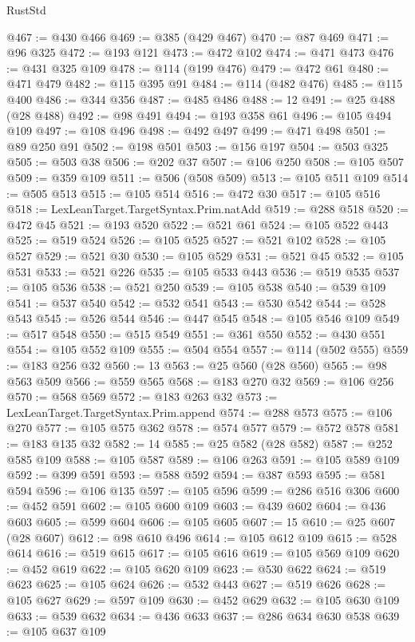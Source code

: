 \begin{lexlean}{RustStd}
\begin{coremodule}
{\begin{coremodule}
{{{{{{{{{{{{{{{{{{{{{{{{{{{{{{{{{{@467 := @430 @466
@469 := @385 (@429 @467)
@470 := @87 @469
@471 := @96 @325
@472 := @193 @121
@473 := @472 @102
@474 := @471 @473
@476 := @431 @325 @109
@478 := @114 (@199 @476)
@479 := @472 @61
@480 := @471 @479
@482 := @115 @395 @91
@484 := @114 (@482 @476)
@485 := @115 @400
@486 := @344 @356
@487 := @485 @486
@488 := 12
@491 := @25 @488 (@28 @488)
@492 := @98 @491
@494 := @193 @358 @61
@496 := @105 @494 @109
@497 := @108 @496
@498 := @492 @497
@499 := @471 @498
@501 := @89 @250 @91
@502 := @198 @501
@503 := @156 @197
@504 := @503 @325
@505 := @503 @38
@506 := @202 @37
@507 := @106 @250
@508 := @105 @507
@509 := @359 @109
@511 := @506 (@508 @509)
@513 := @105 @511 @109
@514 := @505 @513
@515 := @105 @514
@516 := @472 @30
@517 := @105 @516
@518 := LexLeanTarget.TargetSyntax.Prim.natAdd
@519 := @288 @518
@520 := @472 @45
@521 := @193 @520
@522 := @521 @61
@524 := @105 @522 @443
@525 := @519 @524
@526 := @105 @525
@527 := @521 @102
@528 := @105 @527
@529 := @521 @30
@530 := @105 @529
@531 := @521 @45
@532 := @105 @531
@533 := @521 @226
@535 := @105 @533 @443
@536 := @519 @535
@537 := @105 @536
@538 := @521 @250
@539 := @105 @538
@540 := @539 @109
@541 := @537 @540
@542 := @532 @541
@543 := @530 @542
@544 := @528 @543
@545 := @526 @544
@546 := @447 @545
@548 := @105 @546 @109
@549 := @517 @548
@550 := @515 @549
@551 := @361 @550
@552 := @430 @551
@554 := @105 @552 @109
@555 := @504 @554
@557 := @114 (@502 @555)
@559 := @183 @256 @32
@560 := 13
@563 := @25 @560 (@28 @560)
@565 := @98 @563 @509
@566 := @559 @565
@568 := @183 @270 @32
@569 := @106 @256
@570 := @568 @569
@572 := @183 @263 @32
@573 := LexLeanTarget.TargetSyntax.Prim.append
@574 := @288 @573
@575 := @106 @270
@577 := @105 @575 @362
@578 := @574 @577
@579 := @572 @578
@581 := @183 @135 @32
@582 := 14
@585 := @25 @582 (@28 @582)
@587 := @252 @585 @109
@588 := @105 @587
@589 := @106 @263
@591 := @105 @589 @109
@592 := @399 @591
@593 := @588 @592
@594 := @387 @593
@595 := @581 @594
@596 := @106 @135
@597 := @105 @596
@599 := @286 @516 @306
@600 := @452 @591
@602 := @105 @600 @109
@603 := @439 @602
@604 := @436 @603
@605 := @599 @604
@606 := @105 @605
@607 := 15
@610 := @25 @607 (@28 @607)
@612 := @98 @610 @496
@614 := @105 @612 @109
@615 := @528 @614
@616 := @519 @615
@617 := @105 @616
@619 := @105 @569 @109
@620 := @452 @619
@622 := @105 @620 @109
@623 := @530 @622
@624 := @519 @623
@625 := @105 @624
@626 := @532 @443
@627 := @519 @626
@628 := @105 @627
@629 := @597 @109
@630 := @452 @629
@632 := @105 @630 @109
@633 := @539 @632
@634 := @436 @633
@637 := @286 @634 @630 @538
@639 := @105 @637 @109
}}}}}}}}}}}}}}}}}}}}}}}}}}}}}}}}}}
\end{coremodule}}
\end{coremodule}
\end{lexlean}

